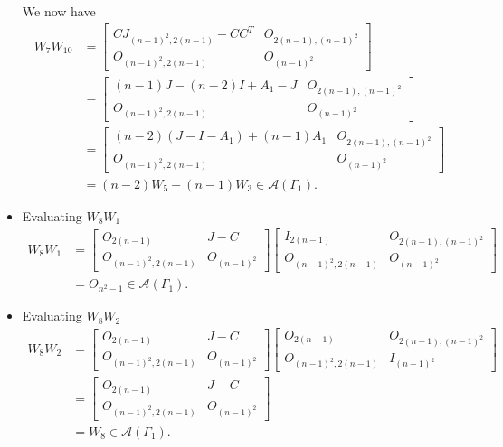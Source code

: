 \begin{itemize}
    We now have
    \begin{align*}
        W_7W_{10}
        &=\begin{bmatrix}
            CJ_{(n-1)^2,2(n-1)} - CC^T & O_{2(n-1),(n-1)^2} \\
            O_{(n-1)^2, 2(n-1)} & O_{(n-1)^2}
        \end{bmatrix}\\
        &=\begin{bmatrix}
            (n-1)J - (n-2)I + A_1 - J & O_{2(n-1),(n-1)^2} \\
            O_{(n-1)^2, 2(n-1)} & O_{(n-1)^2}
        \end{bmatrix}\\
        &= \begin{bmatrix}
            (n-2)(J-I-A_1) +(n-1)A_1 & O_{2(n-1),(n-1)^2} \\
            O_{(n-1)^2, 2(n-1)} & O_{(n-1)^2}
        \end{bmatrix}\\
        &= (n-2)W_5 + (n-1)W_3\in\mathcal{A}(\Gamma_1).
    \end{align*}

    \item Evaluating $W_8W_1$
    \begin{align*}
        W_8W_1
        &= \begin{bmatrix}
            O_{2(n-1)} & J-C \\
            O_{(n-1)^2, 2(n-1)} & O_{(n-1)^2}
        \end{bmatrix}\begin{bmatrix}
            I_{2(n-1)} & O_{2(n-1), (n-1)^2} \\
            O_{(n-1)^2, 2(n-1)} & O_{(n-1)^2}
        \end{bmatrix}\\
        &= O_{n^2-1}\in\mathcal{A}(\Gamma_1).
    \end{align*}
    
    \item Evaluating $W_8W_2$
    \begin{align*}
        W_8W_2
        &= \begin{bmatrix}
            O_{2(n-1)} & J-C \\
            O_{(n-1)^2, 2(n-1)} & O_{(n-1)^2}
        \end{bmatrix}\begin{bmatrix}
            O_{2(n-1)} & O_{2(n-1), (n-1)^2} \\
            O_{(n-1)^2, 2(n-1)} & I_{(n-1)^2}
        \end{bmatrix}\\
        &= \begin{bmatrix}
            O_{2(n-1)} & J-C \\
            O_{(n-1)^2, 2(n-1)} & O_{(n-1)^2}
        \end{bmatrix}\\
        &= W_8\in\mathcal{A}(\Gamma_1).
    \end{align*}
    

\end{itemize}
